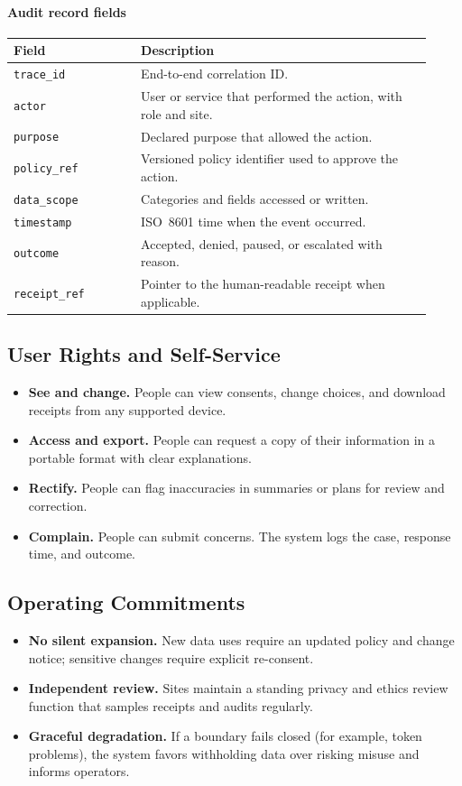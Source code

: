 \documentclass[12pt]{article}
\begin{document}
\paragraph{Audit record fields}
\begin{longtable}{@{}p{0.28\linewidth}p{0.64\linewidth}@{}}
\toprule
\textbf{Field} & \textbf{Description} \\
\midrule
\endhead
\texttt{trace\_id} & End-to-end correlation ID. \\
\texttt{actor} & User or service that performed the action, with role and site. \\
\texttt{purpose} & Declared purpose that allowed the action. \\
\texttt{policy\_ref} & Versioned policy identifier used to approve the action. \\
\texttt{data\_scope} & Categories and fields accessed or written. \\
\texttt{timestamp} & ISO~8601 time when the event occurred. \\
\texttt{outcome} & Accepted, denied, paused, or escalated with reason. \\
\texttt{receipt\_ref} & Pointer to the human-readable receipt when applicable. \\
\bottomrule
\end{longtable}

\subsection*{User Rights and Self-Service}
\begin{itemize}[leftmargin=*]
  \item \textbf{See and change.} People can view consents, change choices, and download receipts from any supported device.
  \item \textbf{Access and export.} People can request a copy of their information in a portable format with clear explanations.
  \item \textbf{Rectify.} People can flag inaccuracies in summaries or plans for review and correction.
  \item \textbf{Complain.} People can submit concerns. The system logs the case, response time, and outcome.
\end{itemize}

\subsection*{Operating Commitments}
\begin{itemize}[leftmargin=*]
  \item \textbf{No silent expansion.} New data uses require an updated policy and change notice; sensitive changes require explicit re-consent.
  \item \textbf{Independent review.} Sites maintain a standing privacy and ethics review function that samples receipts and audits regularly.
  \item \textbf{Graceful degradation.} If a boundary fails closed (for example, token problems), the system favors withholding data over risking misuse and informs operators.
\end{itemize}
\end{document}
